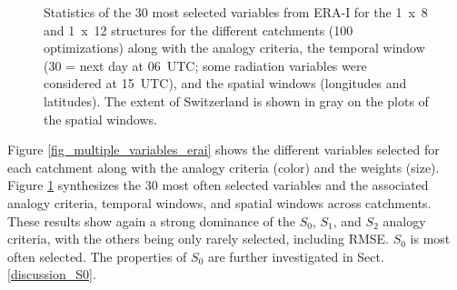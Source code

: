 \documentclass[draft]{agujournal2019}
\begin{document}
\begin{figure}[H]
	\noindent{}
	\caption{Statistics of the 30 most selected variables from ERA-I for the 1~x~8 and 1~x~12 structures for the different catchments (100 optimizations) along with the analogy criteria, the temporal window (30 = next day at 06~UTC; some radiation variables were considered at 15~UTC), and the spatial windows (longitudes and latitudes). The extent of Switzerland is shown in gray on the plots of the spatial windows.}
	\label{fig_stats_params_erai}
\end{figure}


Figure \ref{fig_multiple_variables_erai} shows the different variables selected for each catchment along with the analogy criteria (color) and the weights (size). Figure \ref{fig_stats_params_erai} synthesizes the 30 most often selected variables and the associated analogy criteria, temporal windows, and spatial windows across catchments. These results show again a strong dominance of the $S_{0}$, $S_{1}$, and $S_{2}$ analogy criteria, with the others being only rarely selected, including RMSE. $S_{0}$ is most often selected. The properties of $S_{0}$ are further investigated in Sect. \ref{discussion_S0}.  
\end{document}
